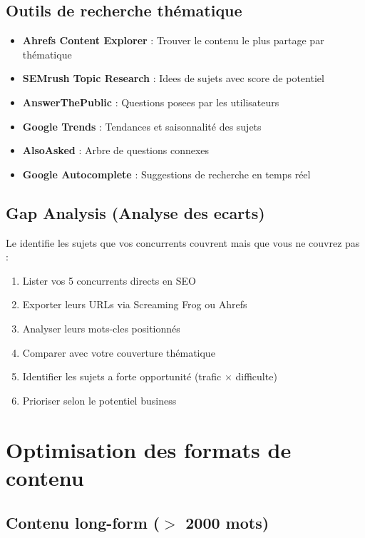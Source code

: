 \subsection{Outils de recherche thématique}

\begin{itemize}
    \item \textbf{Ahrefs Content Explorer} : Trouver le contenu le plus partage par thématique
    \item \textbf{SEMrush Topic Research} : Idees de sujets avec score de potentiel
    \item \textbf{AnswerThePublic} : Questions posees par les utilisateurs
    \item \textbf{Google Trends} : Tendances et saisonnalité des sujets
    \item \textbf{AlsoAsked} : Arbre de questions connexes
    \item \textbf{Google Autocomplete} : Suggestions de recherche en temps réel
\end{itemize}

\subsection{Gap Analysis (Analyse des ecarts)}

Le  identifie les sujets que vos concurrents couvrent mais que vous ne couvrez pas :

\begin{enumerate}
    \item Lister vos 5 concurrents directs en SEO
    \item Exporter leurs URLs via Screaming Frog ou Ahrefs
    \item Analyser leurs mots-cles positionnés
    \item Comparer avec votre couverture thématique
    \item Identifier les sujets a forte opportunité (trafic $\times$ difficulte)
    \item Prioriser selon le potentiel business
\end{enumerate}

\section{Optimisation des formats de contenu}

\subsection{Contenu long-form ($>$ 2000 mots)}

